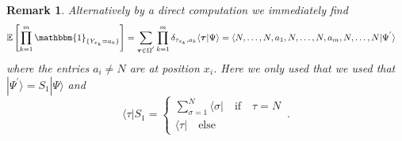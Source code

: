 \documentclass[10pt]{article}
\numberwithin{equation}{section}
\numberwithin{equation}{subsection}
\newtheorem{remark}{Remark}
\begin{document}
{\color{blue}
\begin{remark}
Alternatively by a direct computation we immediately find 
\begin{equation}
\begin{split}
 \mathbb{E}\left[\prod_{k=1}^{m}\mathbbm{1}_{\{Y_{x_{k}}=a_{k}\}}\right]&=\sum_{\bm{\tau}\in\Omega^{'}}\prod_{k=1}^{m}\delta_{{{\tau}_{x_k}},a_{k}}\langle \bm{\tau}|\Psi\rangle=\langle N,\ldots,N,a_1,N,\ldots,N,a_m,N,\ldots,N|\Psi^{'}\rangle
 \end{split}
\end{equation} 
where the entries $a_i\neq N$ are at position $x_i$. Here we only  used that  we used that $|\Psi^{'}\rangle=S_1|\Psi\rangle$ and
\begin{equation}
 \langle \tau |S_1=\begin{cases}
                    \sum_{\sigma=1}^N\langle \sigma|  \quad\text{if}\quad \tau=N\\
                    \langle \tau| \quad\text{else} 
                   \end{cases}\,.
\end{equation} 
\end{remark}

}
\end{document}
